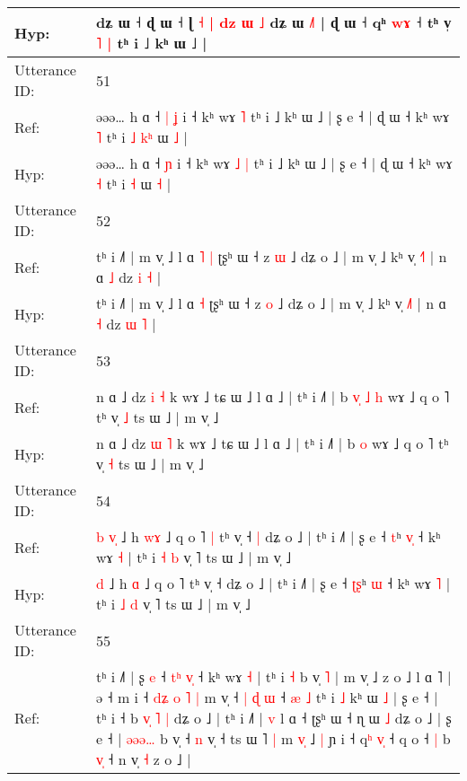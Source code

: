 \documentclass[10pt]{article}
\DeclareRobustCommand{\hl}[1]{{\textcolor{red}{#1}}}
\begin{document}
\begin{longtable}{ll}
 \\
Hyp: & \hl{}\hl{}\hl{}\hl{}\hl{}dʑ ɯ ˧\hl{}\hl{} ɖ ɯ ˧ ɭ\hl{ }\hl{˧} \hl{|}\hl{ }\hl{d}\hl{z} \hl{ɯ}\hl{ }\hl{˩} dʑ ɯ \hl{˩}\hl{˥} | ɖ ɯ ˧ qʰ \hl{w}\hl{ɤ} ˧ tʰ v̩\hl{ }\hl{˥} \hl{|} tʰ i ˩ kʰ ɯ ˩ |
 \\
\midrule
Utterance ID: & 51 \\
Ref: & əəə… h ɑ ˧\hl{ }\hl{|} \hl{ʝ} i ˧ kʰ wɤ\hl{}\hl{} \hl{˥} tʰ i ˩ kʰ ɯ ˩ | ʂ e ˧ | ɖ ɯ ˧ kʰ wɤ \hl{˥} tʰ i\hl{ }\hl{˩} \hl{k}\hl{ʰ} ɯ \hl{˩} |
 \\
Hyp: & əəə… h ɑ ˧\hl{}\hl{} \hl{ɲ} i ˧ kʰ wɤ\hl{ }\hl{˩} \hl{|} tʰ i ˩ kʰ ɯ ˩ | ʂ e ˧ | ɖ ɯ ˧ kʰ wɤ \hl{˧} tʰ i\hl{}\hl{} \hl{}\hl{˧} ɯ \hl{˧} |
 \\
\midrule
Utterance ID: & 52 \\
Ref: & tʰ i ˩˥ | m v̩ ˩ l ɑ\hl{ }\hl{˥} \hl{|} ʈʂʰ ɯ ˧ z \hl{ɯ} ˩ dʑ o ˩ | m v̩ ˩ kʰ v̩ \hl{˧}˥ | n ɑ \hl{˩} dz \hl{i} \hl{˧} |
 \\
Hyp: & tʰ i ˩˥ | m v̩ ˩ l ɑ\hl{}\hl{} \hl{˧} ʈʂʰ ɯ ˧ z \hl{o} ˩ dʑ o ˩ | m v̩ ˩ kʰ v̩ \hl{˩}˥ | n ɑ \hl{˧} dz \hl{ɯ} \hl{˥} |
 \\
\midrule
Utterance ID: & 53 \\
Ref: & n ɑ ˩ dz \hl{i} \hl{˧} k wɤ ˩ tɕ ɯ ˩ l ɑ ˩ | tʰ i ˩˥ | b\hl{ }\hl{v}\hl{̩}\hl{ }\hl{˩} \hl{h} wɤ ˩ q o ˥ tʰ v̩ \hl{˩} ts ɯ ˩ | m v̩ ˩
 \\
Hyp: & n ɑ ˩ dz \hl{ɯ} \hl{˥} k wɤ ˩ tɕ ɯ ˩ l ɑ ˩ | tʰ i ˩˥ | b\hl{}\hl{}\hl{}\hl{}\hl{} \hl{o} wɤ ˩ q o ˥ tʰ v̩ \hl{˧} ts ɯ ˩ | m v̩ ˩
 \\
\midrule
Utterance ID: & 54 \\
Ref: & \hl{b}\hl{ }\hl{v}\hl{̩} ˩ h \hl{w}\hl{ɤ} ˩ q o ˥\hl{ }\hl{|} tʰ v̩ ˧\hl{ }\hl{|} dʑ o ˩ | tʰ i ˩˥ | ʂ e ˧ \hl{}\hl{t}ʰ \hl{v}\hl{̩} ˧ kʰ wɤ \hl{˧} | tʰ i \hl{˧} \hl{b} v̩ ˥ ts ɯ ˩ | m v̩ ˩
 \\
Hyp: & \hl{}\hl{}\hl{}\hl{d} ˩ h \hl{}\hl{ɑ} ˩ q o ˥\hl{}\hl{} tʰ v̩ ˧\hl{}\hl{} dʑ o ˩ | tʰ i ˩˥ | ʂ e ˧ \hl{ʈ}\hl{ʂ}ʰ \hl{}\hl{ɯ} ˧ kʰ wɤ \hl{˥} | tʰ i \hl{˩} \hl{d} v̩ ˥ ts ɯ ˩ | m v̩ ˩
 \\
\midrule
Utterance ID: & 55 \\
Ref: & tʰ i ˩˥ | ʂ \hl{e} ˧ \hl{t}\hl{ʰ} \hl{v}\hl{̩} ˧ kʰ wɤ \hl{˧} | tʰ i\hl{}\hl{}\hl{} \hl{˧} b v̩ \hl{˥} | m v̩ ˩ z o ˩ l ɑ ˥ | ə ˧ m i ˧ \hl{d}\hl{ʑ}\hl{ }\hl{o} \hl{˥} \hl{|} m v̩ ˧ \hl{|}\hl{ }\hl{ɖ} \hl{ɯ} ˧\hl{ }\hl{æ} \hl{˩} tʰ i \hl{˩} kʰ ɯ \hl{˩} | ʂ e ˧ | tʰ i ˧ b\hl{ }\hl{v}\hl{̩} \hl{˥} \hl{|} dʑ o ˩ | tʰ i\hl{}\hl{}\hl{}\hl{}\hl{} ˩˥ | \hl{v} l ɑ ˧ ʈʂʰ ɯ ˧ ɳ ɯ \hl{˩} dʑ o ˩ | ʂ e ˧ | \hl{ə}\hl{ə}\hl{ə}\hl{…} b v̩ ˧ \hl{n} v̩ ˧ ts ɯ ˥\hl{ }\hl{|} m \hl{v}\hl{̩} ˩\hl{ }\hl{|} ɲ i ˧ q\hl{ʰ} \hl{v}\hl{̩} ˧ q o ˧\hl{ }\hl{|} b \hl{v}\hl{̩} ˧ n v̩ \hl{˧} z o ˩ |

\end{longtable}
\end{document}
